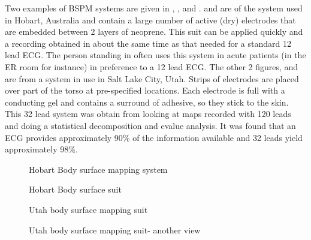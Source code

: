 Two examples of BSPM systems are given in , 
,   and 
.  and  
 are of the system used in Hobart, Australia and contain a large
number of active (dry) electrodes that are embedded between 2 layers of
neoprene. This suit can be applied quickly and a recording obtained in about
the same time as that needed for a standard 12 lead ECG.  The person
standing in  often uses this system in acute patients
(in the ER room for instance) in preference to a 12 lead ECG.  The other 2
figures,  and  
 are from a system in use in Salt Lake City, Utah.
Strips of electrodes are placed over part of the torso at pre-specified
locations. Each electrode is full with a conducting gel and contains a
surround of adhesive, so they stick to the skin.  This 32 lead system was
obtain  from looking at maps recorded with 120
leads and doing a statistical decomposition and evalue analysis.  It was found
that an ECG provides approximately 90\% of the information available and 32
leads yield approximately 98\%.

\begin{figure}[htbp] \centering
  \caption[Hobart body surface mapping system]{Hobart Body surface mapping system}
  \label{fig:body-suit2}
\end{figure}

\begin{figure}[htbp] \centering
  \caption[Hobart body surface suit]{Hobart Body surface suit}
  \label{fig:body-suit}
\end{figure}

\begin{figure}[htbp] \centering
  \caption[Utah body surface mapping suit]{Utah body surface mapping suit}
  \label{fig:body-suit-utah}
\end{figure}

\begin{figure}[htbp] \centering
  \caption[Utah body surface mapping suit - another view]{Utah body surface
    mapping suit- another view}
  \label{fig:body-suit2-utah}
\end{figure}

